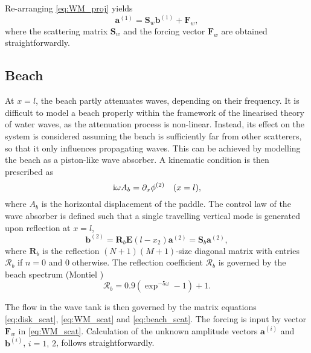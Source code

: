 \documentclass[12pt,a4paper]{article}
\newcommand{\vp}{{\phi}}
\begin{document}
Re-arranging \eqref{eq:WM_proj} yields 
\begin{equation}
  \label{eq:WM_scat}
  \mathbf{a}^{(1)} = \mathbf{S}_w\mathbf{b}^{(1)} + \mathbf{F}_w,
\end{equation}
where the scattering matrix $\mathbf{S}_w$ and the forcing vector $\mathbf{F}_w$ are obtained 
straightforwardly.


\subsection{Beach}

At $x=l$, the beach partly attenuates waves, depending on their frequency. It is difficult to model a beach 
properly within the framework of the linearised theory of water waves, as the attenuation process is 
non-linear. Instead, its effect on the system is considered assuming the beach is sufficiently far from 
other scatterers, so that it only influences propagating waves. This can be achieved by modelling the beach 
as a piston-like wave absorber. A kinematic condition is then prescribed as
\begin{equation}
  \label{eq:beach}
  \ci \omega A_b = \partial_x \vp^{(2)} \quad (x=l),
\end{equation}
where $A_b$ is the horizontal displacement of the paddle. The control law of the wave absorber is defined 
such that a single travelling vertical mode is generated upon reflection at $x=l$, \ie
\begin{equation}
  \label{eq:beach_scat}
  \mathbf{b}^{(2)} = \mathbf{R}_b\mathbf{E}(l-x_2)\mathbf{a}^{(2)} = \mathbf{S}_b\mathbf{a}^{(2)},
\end{equation}
where $\mathbf{R}_b$ is the reflection $(N+1)(M+1)$-size diagonal matrix with entries $\mathcal{R}_b$ if 
$n=0$ and $0$ otherwise. The reflection coefficient $\mathcal{R}_b$ is governed by the beach spectrum 
(Montiel \etal \cite{Montiel_etal12})
\begin{equation}
  \mathcal{R}_b = 0.9\left(\exp^{-5\omega} -1\right) + 1.
\end{equation}

The flow in the wave tank is then governed by the matrix equations \eqref{eq:disk_scat}, \eqref{eq:WM_scat} 
and \eqref{eq:beach_scat}. The forcing is input by vector $\mathbf{F}_w$ in \eqref{eq:WM_scat}. Calculation 
of the unknown amplitude vectors $\mathbf{a}^{(i)}$ and $\mathbf{b}^{(i)}$, $i=1,\,2$, follows 
straightforwardly.




%

%
\end{document}
